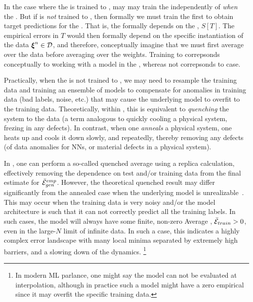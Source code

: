 In the case where the \Teacher is trained to \Interpolation, may may train the \Student 
independently of \emph{when} the \Teacher.  
But if \Teacher is \emph{not} trained to \Interpolation, then formally we must train the \Teacher
first to obtain target predictions for the \Student.  That is, the \Student formally
depends on the \Teacher, $S[T]$.
The empirical errors in $T$ would then formally depend on the specific instantiation of the data  $\boldsymbol{\xi}^{n}\in\mathcal{D}$,
and therefore, conceptually imagine that we must first average over the data
before averaging over the weights.
Training to \Interpolation correpsonds conceptually to working with a model
in the \AnnealedApproximation, whereas not correpsonds to \Quenched case.

Practically, when the \Teacher is not trained to \Interpolation, 
we may need to resample the training data and training an ensemble of models to compensate for anomalies in training data (bad labels, noise, etc.) that may cause the underlying model to overfit to the training data.
Theoretically, within \SMOG, this is equivalent to \emph{quenching} the system to the data (a term analogous to quickly cooling a physical system, frezing in any defects).
In contrast, when one \emph{anneals} a physical system, one heats up and cools it down slowly, and repeatedly, thereby removing any defects (of data anomalies for NNs, or material defects in a physical system).

In \STATMECH, one can perform a so-called quenched average using a replica calculation,
effectively removing the dependence on test and/or training data
from the final estimate for $\bar{\mathcal{E}}^{emp}_{gen}$.
However, the theoretical quenched result may differ significantly from the annealed case when the underlying model is unrealizable~\cite{SST92}. 
This may occur when the training data is very noisy and/or the model architecture is such that it can not correctly predict all the training labels.
In such cases, the model will always have some finite, non-zero Average \TrainingError, $\bar{\mathcal{E}}_{train} > 0$,
even in the large-$N$ limit of infinite data.  In such a case, this indicates
a highly complex error landscape with many local minima separated by extremely high barriers,
and a slowing down of the dynamics.%
\footnote{In modern ML parlance, one might say the model can not be evaluated at interpolation, although 
in practice such a model might have a zero empirical \TrainingError since it may overfit the specific training data.}

